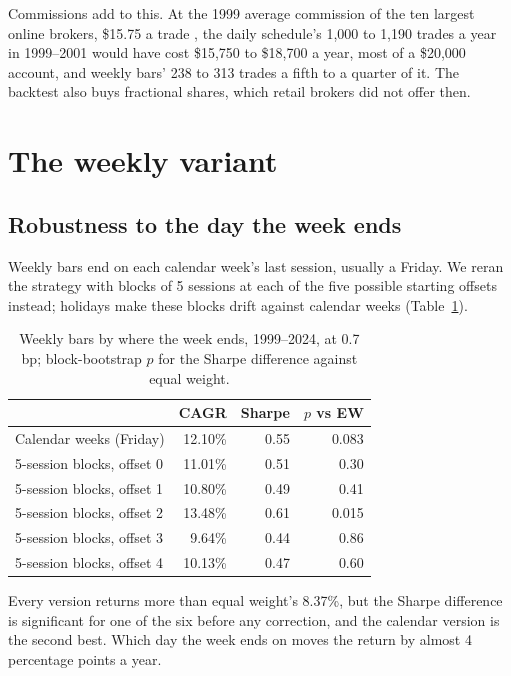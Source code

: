 \documentclass[11pt]{article}
\begin{document}
Commissions add to this. At the 1999 average commission of the ten largest online brokers,
\$15.75 a trade \citep{sec1999}, the daily schedule's 1,000 to 1,190 trades a year in 1999--2001
would have cost \$15,750 to \$18,700 a year, most of a \$20,000 account, and weekly bars' 238 to
313 trades a fifth to a quarter of it. The backtest also buys fractional shares, which retail
brokers did not offer then.

\section{The weekly variant}\label{sec:weekly}

\subsection{Robustness to the day the week ends}\label{sec:offsets}

Weekly bars end on each calendar week's last session, usually a Friday. We reran the strategy
with blocks of 5 sessions at each of the five possible starting offsets instead; holidays make
these blocks drift against calendar weeks (Table~\ref{tab:offsets}).

\begin{table}[ht]
\centering
\caption{Weekly bars by where the week ends, 1999--2024, at 0.7 bp; block-bootstrap $p$ for the
Sharpe difference against equal weight.}\label{tab:offsets}
\begin{tabular}{lrrr}
\toprule
 & CAGR & Sharpe & $p$ vs EW \\
\midrule
Calendar weeks (Friday) & 12.10\% & 0.55 & 0.083 \\
5-session blocks, offset 0 & 11.01\% & 0.51 & 0.30 \\
5-session blocks, offset 1 & 10.80\% & 0.49 & 0.41 \\
5-session blocks, offset 2 & 13.48\% & 0.61 & 0.015 \\
5-session blocks, offset 3 & 9.64\% & 0.44 & 0.86 \\
5-session blocks, offset 4 & 10.13\% & 0.47 & 0.60 \\
\bottomrule
\end{tabular}
\end{table}

Every version returns more than equal weight's 8.37\%, but the Sharpe difference is significant
for one of the six before any correction, and the calendar version is the second best. Which
day the week ends on moves the return by almost 4 percentage points a year.
\end{document}
